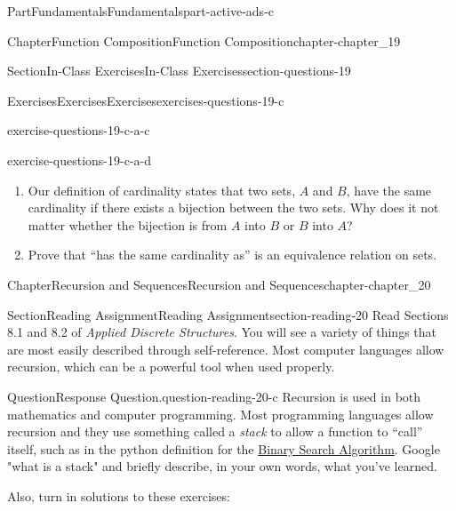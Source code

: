 \documentclass[oneside,10pt,]{book}
\numberwithin{equation}{section}
\begin{document}
\begin{partptx}{Part}{Fundamentals}{}{Fundamentals}{}{}{part-active-ads-c}
\begin{chapterptx}{Chapter}{Function Composition}{}{Function Composition}{}{}{chapter-chapter_19}
\begin{sectionptx}{Section}{In-Class Exercises}{}{In-Class Exercises}{}{}{section-questions-19}
\begin{exercises-subsection-numberless}{Exercises}{Exercises}{}{Exercises}{}{}{exercises-questions-19-c}
\begin{exercisegroup}
\begin{divisionexerciseeg}{3}{}{}{exercise-questions-19-c-a-c}
\end{divisionexerciseeg}%
\begin{divisionexerciseeg}{4}{}{}{exercise-questions-19-c-a-d}%
%
\begin{enumerate}[label=(\alph*)]
\item{}Our definition of cardinality states that two sets, \(A\) and \(B\), have the same cardinality if there exists a bijection between the two sets. Why does it not matter whether the bijection is from \(A\) into \(B\) or \(B\) into \(A\)?%
\item{}Prove that ``has the same cardinality as'' is an equivalence relation on sets.%
\end{enumerate}
%
\end{divisionexerciseeg}%
\end{exercisegroup}
\par\medskip\noindent
\end{exercises-subsection-numberless}
\end{sectionptx}
\end{chapterptx}
%
\typeout{************************************************}
\typeout{************************************************}
%
\begin{chapterptx}{Chapter}{Recursion and Sequences}{}{Recursion and Sequences}{}{}{chapter-chapter_20}
\renewcommand*{\chaptername}{Chapter}
%
%
%
%
\typeout{************************************************}
\typeout{************************************************}
%
\begin{sectionptx}{Section}{Reading Assignment}{}{Reading Assignment}{}{}{section-reading-20}
Read  Sections 8.1 and 8.2 of \emph{Applied Discrete Structures}.  You will see a variety of things that are most easily described through self-reference.  Most computer languages allow recursion, which can be a powerful tool when used properly.%
\begin{question}{Question}{Response Question.}{question-reading-20-c}%
Recursion is used in both mathematics and computer programming. Most programming languages allow recursion and they use something called a \emph{stack} to allow a function to ``call'' itself, such as in the python definition for the \hyperref[section-s-bsa]{Binary Search Algorithm}.  Google "what is a stack" and briefly describe, in your own words, what you've learned.%
\end{question}
Also, turn in solutions to these exercises:%

\end{sectionptx}
\end{chapterptx}
\end{partptx}
\end{document}

